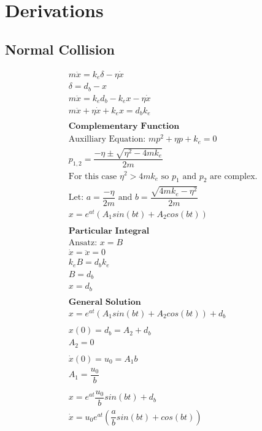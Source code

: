 \documentclass[10pt,a4paper,titlepage]{report}
\begin{document}
\chapter{Derivations}
\label{ch:Derivations}
\section{Normal Collision}
\label{der:normal collision}
\begin{align*}
&m \ddot{x} = k_e \delta - \eta \dot{x} \\
&\delta = d_b - x \\
&m \ddot{x} = k_e d_b - k_e x - \eta \dot{x} \\
&m \ddot{x} + \eta \dot{x} + k_e x = d_b k_e \\\\
&\textbf{Complementary Function} \\
&\text{Auxilliary Equation: } mp^2 + \eta p + k_e = 0 \\
&p_{1,2} = \dfrac{- \eta \pm \sqrt{\eta^2 - 4 m k_e}}{2 m} \\
&\text{For this case $\eta ^ 2 > 4 m k_e$ so $p_1$ and $p_2$ are complex.} \\
&\text{Let: } a = \dfrac{-\eta}{2m} \text{ and } b = \dfrac{\sqrt{4mk_e - \eta ^ 2}}{2m} \\
&x = e^{at} (A_1 sin(bt) + A_2 cos(bt)) \\\\
&\textbf{Particular Integral} \\
&\text{Ansatz: } x = B \\
&\dot{x} = \ddot{x} = 0 \\
&k_e B = d_b k_e \\
&B = d_b \\
&x = d_b \\\\
&\textbf{General Solution} \\
&x = e^{at} (A_1 sin(bt) + A_2 cos(bt)) + d_b \\\\
&x(0) = d_b = A_2 + d_b \\
&A_2 = 0 \\\\
&\dot{x}(0) = u_0 = A_1 b \\
&A_1 = \dfrac{u_0}{b} \\\\
&x = e^{at} \dfrac{u_0}{b} sin(bt) + d_b \\
&\dot{x} = u_0 e^{at} (\dfrac{a}{b} sin(bt) + cos(bt))
\end{align*}
\end{document}
